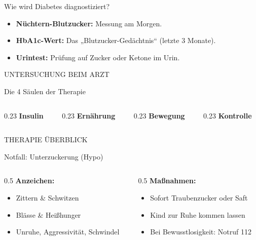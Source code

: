 \documentclass[10pt, aspectratio=169]{beamer}
\newcommand{\imagebox}[2]{%
	\begin{tcolorbox}[enhanced, colback=white, colframe=KitaBlue!20, arc=3mm, width=\textwidth, height=#1, valign=center, halign=center]
		\centering
		\vspace{0.5em}
		\scriptsize \color{KitaBlue!60} \MakeUppercase{#2}
	\end{tcolorbox}
}
\begin{document}
	\begin{frame}{Wie wird Diabetes diagnostiziert?}
		\begin{itemize}
			\item \textbf{Nüchtern-Blutzucker:} Messung am Morgen.
			\item \textbf{HbA1c-Wert:} Das „Blutzucker-Gedächtnis“ (letzte 3 Monate).
			\item \textbf{Urintest:} Prüfung auf Zucker oder Ketone im Urin.
		\end{itemize}
		\vspace{1em}
		\imagebox{2.5cm}{Untersuchung beim Arzt}
	\end{frame}
	
	\begin{frame}{Die 4 Säulen der Therapie}
		\begin{columns}[t]
			\begin{column}{0.23\textwidth}
				\centering
				\textbf{Insulin}
			\end{column}
			\begin{column}{0.23\textwidth}
				\centering
				\textbf{Ernährung}
			\end{column}
			\begin{column}{0.23\textwidth}
				\centering
				\textbf{Bewegung}
			\end{column}
			\begin{column}{0.23\textwidth}
				\centering
				\textbf{Kontrolle}
			\end{column}
		\end{columns}
		\vspace{1.5em}
		\imagebox{2.5cm}{Therapie Überblick}
	\end{frame}
	
	\begin{frame}{Notfall: Unterzuckerung (Hypo)}
		\begin{columns}
			\begin{column}{0.5\textwidth}
				\textbf{Anzeichen:}
				\begin{itemize}
					\item Zittern \& Schwitzen
					\item Blässe \& Heißhunger
					\item Unruhe, Aggressivität, Schwindel
				\end{itemize}
			\end{column}
			\begin{column}{0.5\textwidth}
				\textbf{Maßnahmen:}
				\begin{itemize}
					\item Sofort Traubenzucker oder Saft
					\item Kind zur Ruhe kommen lassen
					\item Bei Bewusstlosigkeit: Notruf 112
				\end{itemize}
			\end{column}
		\end{columns}
	\end{frame}
	
\end{document}
